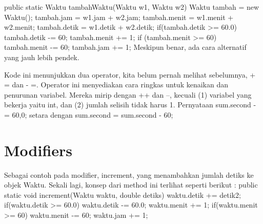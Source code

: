\newline
public static Waktu tambahWaktu(Waktu w1, Waktu w2)\textbraceleft \newline
	Waktu tambah = new Waktu(); \newline
	tambah.jam = w1.jam + w2.jam; \newline
	tambah.menit = w1.menit + w2.menit; \newline
	tambah.detik = w1.detik + w2.detik; \newline
\newline
	if(tambah.detik \textgreater = 60.0)\textbraceleft \newline
		tambah.detik -= 60; \newline
		tambah.menit += 1; \newline
	\textbraceright \newline
\newline
	if (tambah.menit \textgreater = 60)\textbraceleft \newline
		tambah.menit -= 60; \newline
		tambah.jam += 1; \newline
	\textbraceright \newline
\textbraceright \newline
Meskipun benar, ada cara alternatif yang jauh lebih pendek.

Kode ini menunjukkan dua operator, kita belum pernah melihat sebelumnya, + = dan - =. Operator ini menyediakan cara ringkas untuk kenaikan dan penurunan variabel. Mereka mirip dengan ++ dan --, \newline kecuali \newline (1) variabel yang bekerja yaitu int, dan \newline (2) jumlah selisih tidak harus 1. Pernyataan sum.second - = 60,0; setara dengan sum.second = sum.second - 60; \newline
\section{Modifiers}

Sebagai contoh pada modifier, increment, yang menambahkan jumlah detiks ke objek Waktu. Sekali lagi, konsep dari method ini terlihat seperti berikut :
\newline
public static void increment(Waktu waktu, double detiks)\textbraceleft \newline
	waktu.detik += detik2; \newline
\newline
	if(waktu.detik \textgreater = 60.0)\textbraceleft \newline
		waktu.detik -= 60.0; \newline
		waktu.menit += 1; \newline
	\textbraceright \newline
\newline
	if(waktu.menit \textgreater = 60)\textbraceleft \newline
		waktu.menit -= 60; \newline
		waktu.jam += 1; \newline
	\textbraceright \newline
\textbraceright \newline


